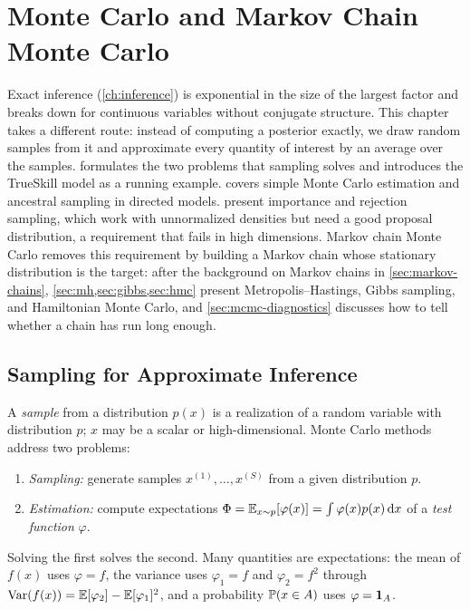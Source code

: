 \chapter{Monte Carlo and Markov Chain Monte Carlo}\label{ch:mcmc}

Exact inference (\cref{ch:inference}) is exponential in the size of the largest factor and breaks down for continuous variables without conjugate structure. This chapter takes a different route: instead of computing a posterior exactly, we draw random samples from it and approximate every quantity of interest by an average over the samples.  formulates the two problems that sampling solves and introduces the TrueSkill model as a running example.  covers simple Monte Carlo estimation and ancestral sampling in directed models.  present importance and rejection sampling, which work with unnormalized densities but need a good proposal distribution, a requirement that fails in high dimensions. Markov chain Monte Carlo removes this requirement by building a Markov chain whose stationary distribution is the target: after the background on Markov chains in \cref{sec:markov-chains}, \cref{sec:mh,sec:gibbs,sec:hmc} present Metropolis--Hastings, Gibbs sampling, and Hamiltonian Monte Carlo, and \cref{sec:mcmc-diagnostics} discusses how to tell whether a chain has run long enough.

\section{Sampling for Approximate Inference}\label{sec:sampling-intro}

A \emph{sample} from a distribution $p(x)$ is a realization of a random variable with distribution $p$; $x$ may be a scalar or high-dimensional. Monte Carlo methods address two problems:
\begin{enumerate}[(1)]
  \item \emph{Sampling:} generate samples $x^{(1)},\dots,x^{(S)}$ from a given distribution $p$.
  \item \emph{Estimation:} compute expectations $\Phi=\mathbb{E}_{x\sim p}[\varphi(x)]=\int\varphi(x)p(x)\,\mathrm{d} x$ of a \emph{test function} $\varphi$.
\end{enumerate}
Solving the first solves the second. Many quantities are expectations: the mean of $f(x)$ uses $\varphi=f$, the variance uses $\varphi_1=f$ and $\varphi_2=f^2$ through $\operatorname{Var}(f(x))=\mathbb{E}[\varphi_2]-\mathbb{E}[\varphi_1]^2$, and a probability $\mathbb{P}(x\in A)$ uses $\varphi=\mathbf{1}_A$.

